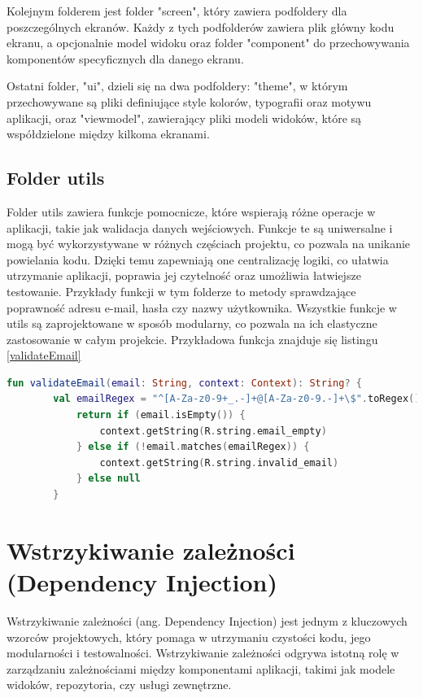 \documentclass[12pt,twoside]{article}
\begin{document}
Kolejnym folderem jest folder "screen", który zawiera podfoldery dla poszczególnych ekranów. Każdy z tych podfolderów 
zawiera plik główny kodu ekranu, a opcjonalnie model widoku oraz folder "component" do przechowywania komponentów 
specyficznych dla danego ekranu.

Ostatni folder, "ui", dzieli się na dwa podfoldery: "theme", w którym przechowywane są pliki definiujące style 
kolorów, typografii oraz motywu aplikacji, oraz "viewmodel", zawierający pliki modeli widoków, które są współdzielone 
między kilkoma ekranami.

\subsection{Folder utils}

Folder utils zawiera funkcje pomocnicze, które wspierają różne operacje w aplikacji, takie jak walidacja danych 
wejściowych. Funkcje te są uniwersalne i mogą być wykorzystywane w różnych częściach projektu, co pozwala na unikanie 
powielania kodu. Dzięki temu zapewniają one centralizację logiki, co ułatwia utrzymanie aplikacji, poprawia jej 
czytelność oraz umożliwia łatwiejsze testowanie. Przykłady funkcji w tym folderze to metody sprawdzające poprawność 
adresu e-mail, hasła czy nazwy użytkownika. Wszystkie funkcje w utils są zaprojektowane w sposób modularny, co 
pozwala na ich elastyczne zastosowanie w całym projekcie. Przykładowa funkcja znajduje się listingu \ref{validateEmail}

\begin{lstlisting}[language=Kotlin,caption=kod funkcji validateEmail, label={validateEmail}]
	fun validateEmail(email: String, context: Context): String? {
    	val emailRegex = "^[A-Za-z0-9+_.-]+@[A-Za-z0-9.-]+\$".toRegex()
    		return if (email.isEmpty()) {
        		context.getString(R.string.email_empty)
    		} else if (!email.matches(emailRegex)) {
        		context.getString(R.string.invalid_email)
    		} else null
		}
\end{lstlisting}

\clearpage

\section{Wstrzykiwanie zależności (Dependency Injection)}

Wstrzykiwanie zależności (ang. Dependency Injection) jest jednym z kluczowych wzorców projektowych, który pomaga 
w utrzymaniu czystości kodu, jego modularności i testowalności. Wstrzykiwanie zależności odgrywa istotną rolę w 
zarządzaniu zależnościami między komponentami aplikacji, takimi jak modele widoków, repozytoria, czy usługi 
zewnętrzne.
\end{document}
